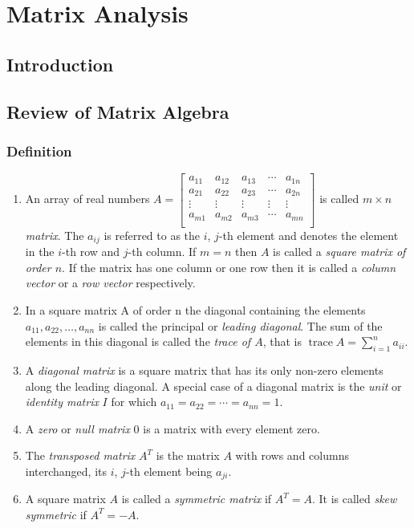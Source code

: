 \documentclass[12pt,a4paper,fleqn]{mycalc}
\begin{document}
	\chapter{Matrix Analysis}
	\section{Introduction}
	\section{Review of Matrix Algebra}
	\subsection{Definition}
	\begin{enumerate}[a]
		\item An array of real numbers 
		\(
		A=\begin{bmatrix}
		a_{11} & a_{12} & a_{13} & \cdots & a_{1n}\\
		a_{21} & a_{22} & a_{23} & \cdots & a_{2n}\\
		\vdots & \vdots & \vdots & \vdots & \vdots\\
		a_{m1} & a_{m2} & a_{m3} & \cdots & a_{mn}\\
		\end{bmatrix}
		\)
		is called \emph{\( m\times n \) matrix}. The \( a_{ij} \) is referred to as the \( i \), \( j \)-th element and denotes the element in the \( i \)-th row and \( j \)-th column. If \( m = n \) then \( A \) is called a \emph{square matrix of order \( n \)}. If the matrix has one column or one row then it is called a \emph{column vector} or a \emph{row vector} respectively.
		\item In a square matrix A of order n the diagonal containing the elements \( a_{11}, a_{22}, \dots ,
		a_{nn} \) is called the principal or \emph{leading diagonal}. The sum of the elements in this diagonal is called the \emph{trace of \( A \)}, that is \( \operatorname{trace} A=\sum_{i=1}^{n}a_{ii}. \)
		\item A \emph{diagonal matrix} is a square matrix that has its only non-zero elements along the leading diagonal. A special case of a diagonal matrix is the \emph{unit} or \emph{identity matrix} \( I \) for which \( a_{11} = a_{22} = \cdots = a_{nn} = 1. \)
		\item A \emph{zero} or \emph{null matrix} \( 0 \) is a matrix with every element zero.
		\item The \emph{transposed matrix} \( A^{T} \) is the matrix \( A \) with rows and columns interchanged,
		its \( i \), \( j \)-th element being \( a_{ji}. \)
		\item A square matrix \( A \) is called a \emph{symmetric matrix} if \( A^{T}=A. \) It is called \emph{skew symmetric} if \( A^{T}=-A. \)
	\end{enumerate}
\end{document}
